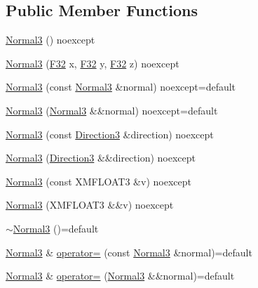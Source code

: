 \subsection*{Public Member Functions}
\begin{DoxyCompactItemize}
\item 
\hyperlink{structmage_1_1_normal3_a64a99fa013aff357da71a39f1957e7c6}{Normal3} () noexcept
\item 
\hyperlink{structmage_1_1_normal3_a1e6a74b5548a443c5b8389e7d8dd3210}{Normal3} (\hyperlink{namespacemage_aa97e833b45f06d60a0a9c4fc22ae02c0}{F32} x, \hyperlink{namespacemage_aa97e833b45f06d60a0a9c4fc22ae02c0}{F32} y, \hyperlink{namespacemage_aa97e833b45f06d60a0a9c4fc22ae02c0}{F32} z) noexcept
\item 
\hyperlink{structmage_1_1_normal3_af39f2985925addc37f1a9e3d00785b57}{Normal3} (const \hyperlink{structmage_1_1_normal3}{Normal3} \&normal) noexcept=default
\item 
\hyperlink{structmage_1_1_normal3_ab29b3dcf7fc05c459f2e9b91b6832115}{Normal3} (\hyperlink{structmage_1_1_normal3}{Normal3} \&\&normal) noexcept=default
\item 
\hyperlink{structmage_1_1_normal3_a477777d95f0ad41e6087668c965dd9b2}{Normal3} (const \hyperlink{structmage_1_1_direction3}{Direction3} \&direction) noexcept
\item 
\hyperlink{structmage_1_1_normal3_a55d265ba8454dd5d4573ad9d09844cee}{Normal3} (\hyperlink{structmage_1_1_direction3}{Direction3} \&\&direction) noexcept
\item 
\hyperlink{structmage_1_1_normal3_ad812f4b279f8ef1a28f71925c90efcf8}{Normal3} (const X\+M\+F\+L\+O\+A\+T3 \&v) noexcept
\item 
\hyperlink{structmage_1_1_normal3_ac6a5bc0d574ab2a85dba8e5cb8539d58}{Normal3} (X\+M\+F\+L\+O\+A\+T3 \&\&v) noexcept
\item 
\hyperlink{structmage_1_1_normal3_a3384b2970fd85fe729514ce0686b4446}{$\sim$\+Normal3} ()=default
\item 
\hyperlink{structmage_1_1_normal3}{Normal3} \& \hyperlink{structmage_1_1_normal3_ad446f029ba58615f98b4da13e7e4c5ba}{operator=} (const \hyperlink{structmage_1_1_normal3}{Normal3} \&normal)=default
\item 
\hyperlink{structmage_1_1_normal3}{Normal3} \& \hyperlink{structmage_1_1_normal3_ab8fd629ae1e399b468a229fc4ea58222}{operator=} (\hyperlink{structmage_1_1_normal3}{Normal3} \&\&normal)=default
\end{DoxyCompactItemize}


